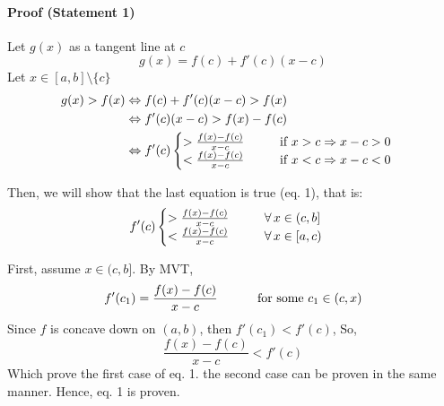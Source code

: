 \documentclass[12pt]{article}
\newcommand\tab[1][1cm]{\hspace*{#1}}
\begin{document}
\paragraph{Proof (Statement 1)}
Let $g(x)$ as a tangent line at $c$
\[
    g(x) = f(c) + f'(c)(x - c)
\]
Let $x \in [a, b] \setminus \{c\}$ 
\begin{align*} 
    g(x) > f(x) &\Leftrightarrow f(c) + f'(c)(x - c) > f(x) \\
    &\Leftrightarrow f'(c)(x - c) > f(x) - f(c) \\
    &\Leftrightarrow f'(c) 
    \begin{cases}
        > \frac{f(x) - f(c)}{x - c} \textrm{\tab if } x > c \Rightarrow x - c > 0\\ 
        < \frac{f(x) - f(c)}{x - c} \textrm{\tab if } x < c \Rightarrow x - c < 0\\
    \end{cases} 
\end{align*} 
\begin{figure}[h!] 
    \centering
\end{figure}
Then, we will show that the last equation is true (eq. 1), that is: 
\begin{align*} 
    f'(c) 
    \begin{cases}
        > \frac{f(x) - f(c)}{x - c} \textrm{\tab } \forall \, x \in (c, b]\\ 
        < \frac{f(x) - f(c)}{x - c} \textrm{\tab } \forall \, x \in [a, c)\\
    \end{cases} 
\end{align*}

\noindent
First, assume $x \in (c, b]$. By MVT,
\[
    f'(c_1) = \frac{f(x) - f(c)}{x - c} \textrm{ \tab for some } c_1 \in (c, x)
\]
Since $f$ is concave down on $(a, b)$, then $f'(c_1) < f'(c)$, So,
\[
    \frac{f(x) - f(c)}{x - c} < f'(c)
\]
Which prove the first case of eq. 1. the second case can be proven in the same manner. Hence,
eq. 1 is proven.
\end{document}
